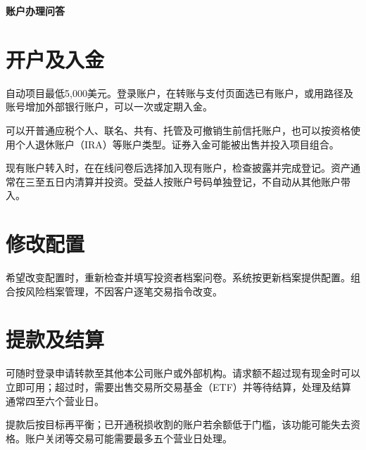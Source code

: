 \documentclass[UTF8,fontset=none,11pt,a4paper]{ctexart}
\begin{document}
{\noindent\fontsize{20}{25}\selectfont\bfseries 账户办理问答\par}
\vspace{10pt}
\section*{开户及入金}
自动项目最低5,000美元。登录账户，在转账与支付页面选已有账户，或用路径及账号增加外部银行账户，可以一次或\allowbreak\mbox{定期入金。}


可以开普通应税个人、联名、共有、托管及可撤销生前信托账户，也可以按资格使用个人退休账户（IRA）等账户类型。证券入金可能被出售并投入项\allowbreak\mbox{目组合。}


现有账户转入时，在在线问卷后选择加入现有账户，检查披露并完成登记。资产通常在三至五日内清算并投资。受益人按账户号码单独登记，不自动从其他\allowbreak\mbox{账户带入。}


\section*{修改配置}
希望改变配置时，重新检查并填写投资者档案问卷。系统按更新档案提供配置。组合按风险档案管理，不因客户逐笔交易\allowbreak\mbox{指令改变。}


\section*{提款及结算}
可随时登录申请转款至其他本公司账户或外部机构。请求额不超过现有现金时可以立即可用；超过时，需要出售交易所交易基金（ETF）并等待结算，处理及结算通常四至六个\allowbreak\mbox{营业日。}


提款后按目标再平衡；已开通税损收割的账户若余额低于门槛，该功能可能失去资格。账户关闭等交易可能需要最多五个营\allowbreak\mbox{业日处理。}
\end{document}
